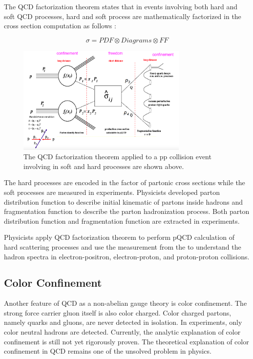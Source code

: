 The QCD factorization theorem states that in events involving both hard and soft QCD processes, hard and soft process are mathematically factorized in the cross section computation as follows \cite{QCDFactorization}: 

\begin{equation}
\sigma = PDF \otimes Diagrams \otimes FF
\end{equation}

\begin{figure}[hbtp]
\begin{center}
\includegraphics[width=0.75\textwidth]{Figures/Chapter1/QCDFactorizationTheorem.png}
\caption{The QCD factorization theorem applied to a pp collision event involving in soft and hard processes are shown above.}
\label{QCDFacTheo}
\end{center}
\end{figure} 

The hard processes are encoded in the factor of partonic cross sections while the soft processes are measured in experiments. Physicists developed parton distribution function to describe initial kinematic of partons inside hadrons and fragmentation function to describe the parton hadronization process. Both parton distribution function and fragmentation function are extracted in experiments.


Physicists apply QCD factorization theorem to perform pQCD calculation of hard scattering processes and use the measurement from the  to understand the hadron spectra in electron-positron, electron-proton, and proton-proton collisions.

\subsection{Color Confinement}

Another feature of QCD as a non-abelian gauge theory is color confinement. The strong force carrier gluon itself is also color charged. Color charged partons, namely quarks and gluons, are never detected in isolation. In experiments, only color neutral hadrons are detected. Currently, the analytic explanation of color confinement is still not yet rigorously proven. The theoretical explanation of color confinement in QCD remains one of the unsolved problem in physics. 

